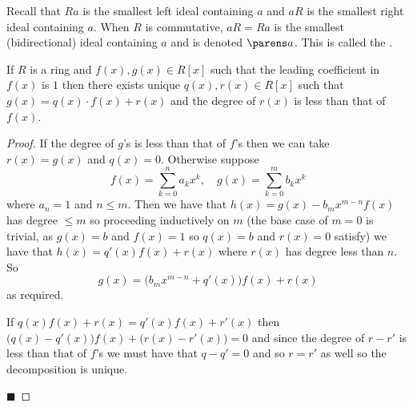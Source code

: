 \documentclass[10pt]{article}
\def\qed{\hskip1cm\hbox{}\hfill$\blacksquare$}
\begin{document}
\begin{defn*}

    Recall that $Ra$ is the smallest left ideal containing $a$ and $aR$ is the smallest right ideal containing $a$.
    When $R$ is commutative, $aR=Ra$ is the smallest (bidirectional) ideal containing $a$ and is denoted $\parens a$.
    This is called the .

\end{defn*}

\begin{prop*}

    If $R$ is a ring and $f(x),g(x)\in R[x]$ such that the leading coefficient in $f(x)$ is $1$ then there exists unique $q(x),r(x)\in R[x]$ such that $g(x)=q(x)\cdot f(x)+r(x)$ and the degree
    of $r(x)$ is less than that of $f(x)$.

\end{prop*}

\begin{proof}

    If the degree of $g$'s is less than that of $f$'s then we can take $r(x)=g(x)$ and $q(x)=0$.
    Otherwise suppose
    \[ f(x) = \sum_{k=0}^n a_kx^k,\quad g(x) = \sum_{k=0}^m b_kx^k \]
    where $a_n=1$ and $n\leq m$.
    Then we have that $h(x) = g(x) - b_mx^{m-n}f(x)$ has degree $\leq m$ so proceeding inductively on $m$ (the base case of $m=0$ is trivial, as $g(x)=b$ and $f(x)=1$ so $q(x)=b$ and $r(x)=0$ satisfy)
    we have that $h(x)=q'(x)f(x)+r(x)$ where $r(x)$ has degree less than $n$.
    So
    \[ g(x) = \bigl(b_mx^{m-n}+q'(x)\bigr)f(x) + r(x) \]
    as required.

    If $q(x)f(x)+r(x) = q'(x)f(x)+r'(x)$ then $\bigl(q(x)-q'(x)\bigr)f(x) + \bigl(r(x)-r'(x)\bigr) = 0$ and since the degree of $r-r'$ is less than that of $f$'s we must have that $q-q'=0$ and so $r=r'$ as
    well so the decomposition is unique.

    \qed

\end{proof}
\end{document}

